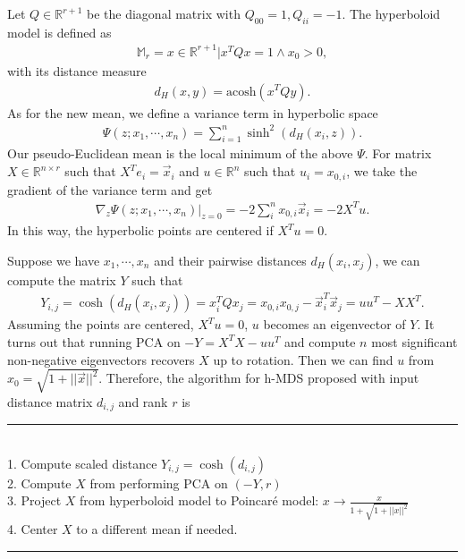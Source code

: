 Let $Q \in \mathbb{R}^{r+1}$ be the diagonal matrix with $Q_{00} = 1, Q_{ii} = -1$. The hyperboloid model is defined as 
\begin{align*}
    \mathbb{M}_r = {x \in \mathbb{R}^{r+1}|x^TQx = 1 \wedge x_0 > 0},
\end{align*}
with its distance measure
\begin{align*}
    d_H(x, y) = \text{acosh}(x^TQy).
\end{align*}
As for the new mean, we define a variance term in hyperbolic space
\begin{align*}
    \Psi(z; x_1, \cdots, x_n) = \sum^n_{i=1}\sinh^2(d_H(x_i, z)).
\end{align*}
Our pseudo-Euclidean mean is the local minimum of the above $\Psi$. For matrix $X \in \mathbb{R}^{n \times r}$ such that $X^Te_i = \Vec{x}_i$ and $u \in \mathbb{R}^n$ such that $u_i = x_{0, i}$, we take the gradient of the variance term and get
\begin{align*}
    \nabla_z \Psi(z; x_1, \cdots, x_n)|_{z= 0} = -2 \sum^n_i x_{0, i}\Vec{x}_i = -2X^Tu. 
\end{align*}
In this way, the hyperbolic points are centered if $X^Tu = 0$. 

Suppose we have $x_1, \cdots, x_n$ and their pairwise distances $d_H(x_i, x_j)$, we can compute the matrix $Y$ such that 
\begin{align*}
    Y_{i, j} = \cosh(d_H(x_i, x_j)) = x_i^TQx_j = x_{0, i}x_{0, j} - \Vec{x}_i^T\Vec{x}_j = uu^T - XX^T.
\end{align*}
Assuming the points are centered, $X^Tu = 0$, $u$ becomes an eigenvector of $Y$. It turns out that running PCA on $-Y = X^TX - uu^T$ and compute $n$ most significant non-negative eigenvectors recovers $X$ up to rotation. Then we can find $u$ from $x_0 = \sqrt{1 + ||\Vec{x}||^2}$. Therefore, the algorithm for h-MDS proposed with input distance matrix $d_{i, j}$ and rank $r$ is \\
\rule{\linewidth}{0.5pt} \\
1. Compute scaled distance $Y_{i, j} = \cosh(d_{i, j})$\\
2. Compute $X$ from performing PCA on $(-Y, r)$\\
3. Project $X$ from hyperboloid model to Poincar\'e model: $x \rightarrow \frac{x}{1 + \sqrt{1 + ||x||^2}}$\\
4. Center $X$ to a different mean if needed. \\
\rule{\linewidth}{0.5pt} \\

